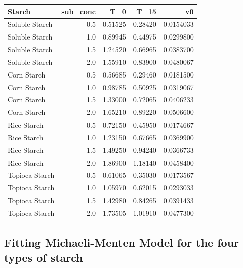 \documentclass[
  12pt,
]{article}
\begin{document}
\begin{tabular}{lrrrr}
\toprule
Starch & sub\_conc & T\_0 & T\_15 & v0\\
\midrule
Soluble Starch & 0.5 & 0.51525 & 0.28420 & 0.0154033\\
Soluble Starch & 1.0 & 0.89945 & 0.44975 & 0.0299800\\
Soluble Starch & 1.5 & 1.24520 & 0.66965 & 0.0383700\\
Soluble Starch & 2.0 & 1.55910 & 0.83900 & 0.0480067\\
Corn Starch & 0.5 & 0.56685 & 0.29460 & 0.0181500\\
\addlinespace
Corn Starch & 1.0 & 0.98785 & 0.50925 & 0.0319067\\
Corn Starch & 1.5 & 1.33000 & 0.72065 & 0.0406233\\
Corn Starch & 2.0 & 1.65210 & 0.89220 & 0.0506600\\
Rice Starch & 0.5 & 0.72150 & 0.45950 & 0.0174667\\
Rice Starch & 1.0 & 1.23150 & 0.67665 & 0.0369900\\
\addlinespace
Rice Starch & 1.5 & 1.49250 & 0.94240 & 0.0366733\\
Rice Starch & 2.0 & 1.86900 & 1.18140 & 0.0458400\\
Topioca Starch & 0.5 & 0.61065 & 0.35030 & 0.0173567\\
Topioca Starch & 1.0 & 1.05970 & 0.62015 & 0.0293033\\
Topioca Starch & 1.5 & 1.42980 & 0.84265 & 0.0391433\\
\addlinespace
Topioca Starch & 2.0 & 1.73505 & 1.01910 & 0.0477300\\
\bottomrule
\end{tabular}

\subsection{Fitting Michaeli-Menten Model for the four types of
starch}\label{fitting-michaeli-menten-model-for-the-four-types-of-starch}
\end{document}
